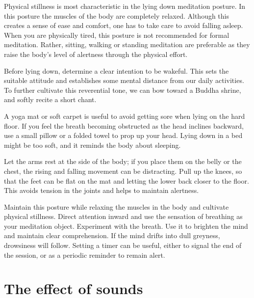 \noindent Physical stillness is most characteristic in the lying down
meditation posture. In this posture the muscles of the body are
completely relaxed. Although this creates a sense of ease and comfort,
one has to take care to avoid falling asleep. When you are physically
tired, this posture is not recommended for formal meditation. Rather,
sitting, walking or standing meditation are preferable as they raise the
body's level of alertness through the physical effort.

\clearpage
\thispagestyle{empty}\mbox{}
\clearpage

Before lying down, determine a clear intention to be wakeful. This sets
the suitable attitude and establishes some mental distance from our
daily activities. To further cultivate this reverential tone, we can bow
toward a Buddha shrine, and softly recite a short chant.

A yoga mat or soft carpet is useful to avoid getting sore when lying on
the hard floor. If you feel the breath becoming obstructed as the head
inclines backward, use a small pillow or a folded towel to prop up your
head. Lying down in a bed might be too soft, and it reminds the body
about sleeping.

Let the arms rest at the side of the body; if you place them on the
belly or the chest, the rising and falling movement can be distracting.
Pull up the knees, so that the feet can be flat on the mat and letting
the lower back closer to the floor. This avoids tension in the joints
and helps to maintain alertness.

Maintain this posture while relaxing the muscles in the body and
cultivate physical stillness. Direct attention inward and use the
sensation of breathing as your meditation object. Experiment with the
breath. Use it to brighten the mind and maintain clear comprehension. If
the mind drifts into dull greyness, drowsiness will follow. Setting a
timer can be useful, either to signal the end of the session, or as a
periodic reminder to remain alert.

\clearpage

\section{The effect of sounds}

